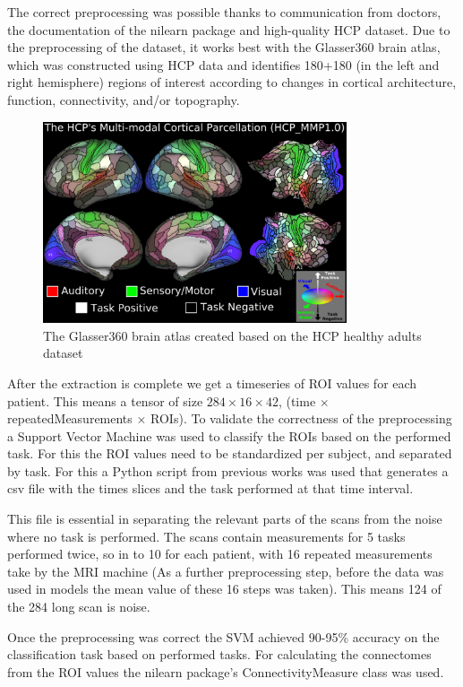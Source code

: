 	The correct preprocessing was possible thanks to communication from doctors, the documentation of the nilearn package and high-quality HCP dataset. Due to the preprocessing of the dataset, it works best with the Glasser360 brain atlas\cite{sporns2005human}, which was constructed using HCP data and identifies 180+180 (in the left and right hemisphere) regions of interest according to changes in cortical architecture, function, connectivity, and/or topography.

	\begin{figure}[!h]
		\centering
		\includegraphics[width=0.8\textwidth]{figures/atlas.png}
		\caption{The Glasser360 brain atlas created based on the HCP healthy adults dataset\cite{sporns2005human}}
	\end{figure}

	After the extraction is complete we get a timeseries of ROI values for each patient. This means a tensor of size $284 \times 16 \times 42$, (time $\times$ repeatedMeasurements $\times$ ROIs). To validate the correctness of the preprocessing a Support Vector Machine was used to classify the ROIs based on the performed task. For this the ROI values need to be standardized per subject, and separated by task. For this a Python script from previous works was used that generates a csv file with the times slices and the task performed at that time interval. 
	
	This file is essential in separating the relevant parts of the scans from the noise where no task is performed. The scans contain measurements for 5 tasks performed twice, so in to 10 for
	each patient, with 16 repeated measurements take by the MRI machine (As a further preprocessing step, before the data was used in models the mean value of these 16 steps was taken). This means 124 of the 284 long
	scan is noise.
	
	Once the preprocessing was correct the SVM achieved 90-95\% accuracy on the classification task based on performed tasks. For calculating the connectomes from the ROI values the nilearn package’s ConnectivityMeasure class was used. 
	
